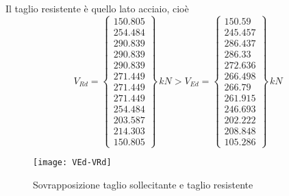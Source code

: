 Il taglio resistente è quello lato acciaio, cioè
\[
V_{Rd} = \begin{Bmatrix}
	150.805\\
	254.484\\
	290.839\\
	290.839\\
	290.839\\
	271.449\\
	271.449\\
	271.449\\
	254.484\\
	203.587\\
	214.303\\
	150.805
\end{Bmatrix}\,kN > V_{Ed} = 
\begin{Bmatrix}
	150.59 \\  245.457 \\  286.437 \\  286.33 \\  272.636 \\  266.498 \\  266.79 \\  261.915 \\  246.693 \\  202.222 \\  208.848 \\  105.286
\end{Bmatrix}\,kN
\]

\begin{figure}
    \centering
	\texttt{[image: VEd-VRd]}
	\caption{Sovrapposizione taglio sollecitante e taglio resistente}
	\label{fig:VEd-VRd}
\end{figure}
\cleardoublepage
\pagebreak
\thispagestyle{empty}
\cleardoublepage
